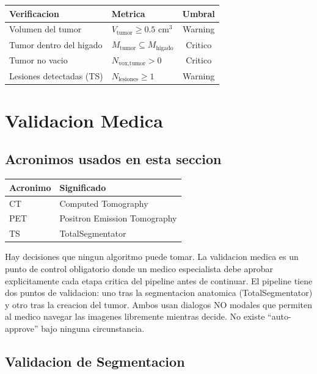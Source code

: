 \documentclass[12pt,a4paper]{article}
\begin{document}
\begin{table}[H]
\centering
\begin{tabular}{llc}
\toprule
\textbf{Verificacion} & \textbf{Metrica} & \textbf{Umbral} \\
\midrule
Volumen del tumor & $V_{\text{tumor}} \geq 0.5$ cm$^3$ & Warning \\
Tumor dentro del higado & $M_{\text{tumor}} \subseteq M_{\text{higado}}$ & Critico \\
Tumor no vacio & $N_{\text{vox,tumor}} > 0$ & Critico \\
Lesiones detectadas (TS) & $N_{\text{lesiones}} \geq 1$ & Warning \\
\bottomrule
\end{tabular}
\end{table}

\newpage

\section{Validacion Medica}
\label{sec:validacion}

\subsection*{Acronimos usados en esta seccion}
\begin{tabular}{ll}
\toprule
\textbf{Acronimo} & \textbf{Significado} \\
\midrule
CT & Computed Tomography \\
PET & Positron Emission Tomography \\
TS & TotalSegmentator \\
\bottomrule
\end{tabular}

Hay decisiones que ningun algoritmo puede tomar. La validacion medica es un punto de control
obligatorio donde un medico especialista debe aprobar explicitamente cada etapa critica del
pipeline antes de continuar. El pipeline tiene dos puntos de validacion: uno tras la
segmentacion anatomica (TotalSegmentator) y otro tras la creacion del tumor. Ambos usan
dialogos NO modales que permiten al medico navegar las imagenes libremente mientras decide.
No existe ``auto-approve'' bajo ninguna circunstancia.

\subsection{Validacion de Segmentacion}
\end{document}
